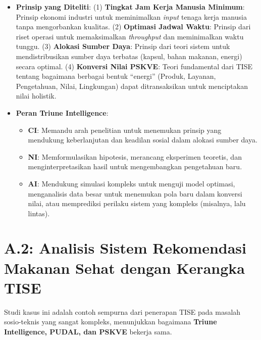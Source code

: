 \documentclass[
  letterpaper,
  DIV=11,
  numbers=noendperiod]{scrreprt}
\providecommand{\tightlist}{%
  \setlength{\itemsep}{0pt}\setlength{\parskip}{0pt}}
\begin{document}
\begin{itemize}
  \begin{itemize}
  \tightlist
  \item
    \textbf{Prinsip yang Diteliti}: (1) \textbf{Tingkat Jam Kerja
    Manusia Minimum}: Prinsip ekonomi industri untuk meminimalkan
    \emph{input} tenaga kerja manusia tanpa mengorbankan kualitas. (2)
    \textbf{Optimasi Jadwal Waktu}: Prinsip dari riset operasi untuk
    memaksimalkan \emph{throughput} dan meminimalkan waktu tunggu. (3)
    \textbf{Alokasi Sumber Daya}: Prinsip dari teori sistem untuk
    mendistribusikan sumber daya terbatas (kapsul, bahan makanan,
    energi) secara optimal. (4) \textbf{Konversi Nilai PSKVE}: Teori
    fundamental dari TISE tentang bagaimana berbagai bentuk ``energi''
    (Produk, Layanan, Pengetahuan, Nilai, Lingkungan) dapat
    ditransaksikan untuk menciptakan nilai holistik.
  \item
    \textbf{Peran Triune Intelligence}:

    \begin{itemize}
    \tightlist
    \item
      \textbf{CI}: Memandu arah penelitian untuk menemukan prinsip yang
      mendukung keberlanjutan dan keadilan sosial dalam alokasi sumber
      daya.
    \item
      \textbf{NI}: Memformulasikan hipotesis, merancang eksperimen
      teoretis, dan menginterpretasikan hasil untuk mengembangkan
      pengetahuan baru.
    \item
      \textbf{AI}: Mendukung simulasi kompleks untuk menguji model
      optimasi, menganalisis data besar untuk menemukan pola baru dalam
      konversi nilai, atau memprediksi perilaku sistem yang kompleks
      (misalnya, lalu lintas).
    \end{itemize}
  \end{itemize}
\end{itemize}

\section{\texorpdfstring{\textbf{A.2: Analisis Sistem Rekomendasi
Makanan Sehat dengan Kerangka
TISE}}{A.2: Analisis Sistem Rekomendasi Makanan Sehat dengan Kerangka TISE}}\label{a.2-analisis-sistem-rekomendasi-makanan-sehat-dengan-kerangka-tise}

Studi kasus ini adalah contoh sempurna dari penerapan TISE pada masalah
sosio-teknis yang sangat kompleks, menunjukkan bagaimana \textbf{Triune
Intelligence, PUDAL, dan PSKVE} bekerja sama.
\end{document}
